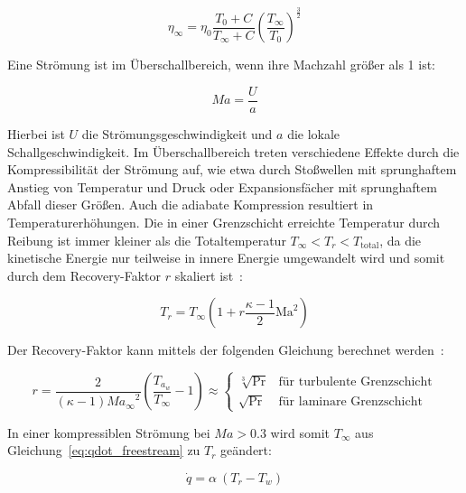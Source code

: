 \begin{equation}
  \label{eq:dynamische_viskositaet}
  \eta_{\infty} = \eta_0 \frac{T_0 + C}{T_{\infty} + C} {\left( \frac{T_{\infty}}{T_0} \right)}^{\frac{3}{2}}
\end{equation}

Eine Strömung ist im Überschallbereich, wenn ihre Machzahl größer als 1 ist:

\begin{equation}
  \label{eq:machzahl}
  Ma = \frac{U}{a}
\end{equation}

Hierbei ist $U$ die Strömungsgeschwindigkeit und $a$ die lokale Schallgeschwindigkeit. Im Überschallbereich treten verschiedene
Effekte durch die Kompressibilität der Strömung auf, wie etwa durch Stoßwellen mit sprunghaftem Anstieg von Temperatur und Druck
oder Expansionsfächer mit sprunghaftem Abfall dieser Größen. Auch die adiabate Kompression resultiert in Temperaturerhöhungen.
Die in einer Grenzschicht erreichte Temperatur durch Reibung
ist immer kleiner als die Totaltemperatur \mbox{$T_{\infty} < T_r < T_\mathrm{total}$}, da die kinetische Energie nur teilweise in innere Energie
umgewandelt wird und somit durch dem Recovery-Faktor $r$ skaliert ist~\cite{Anderson-2017}:

\begin{equation}
  \label{eq:recovery_temperatur}
  T_r = T_{\infty} \left( 1 + r \frac{\kappa - 1}{2} \text{Ma}^2 \right)
\end{equation}

Der Recovery-Faktor kann mittels der folgenden Gleichung berechnet werden~\cite{Anderson-2017}:

\begin{equation}
  \label{eq:recovery_faktor}
  r = \frac{2}{\left( \kappa - 1 \right) {Ma_{\infty}}^2} \left( \frac{T_{a_{w}}}{T_{\infty}} - 1 \right) \approx
  \begin{cases}
    \sqrt[3]{\text{Pr}} & \text{für turbulente Grenzschicht}\\
    \sqrt{\text{Pr}} & \text{für laminare Grenzschicht}
  \end{cases}
\end{equation}

In einer kompressiblen Strömung bei $Ma > 0.3$ wird somit $T_{\infty}$ aus Gleichung~\ref{eq:qdot_freestream} zu $T_r$ geändert:

\begin{equation}
  \label{eq:qdot_recovery}
  \dot{q} = \alpha \ (T_r - T_w)
\end{equation}

